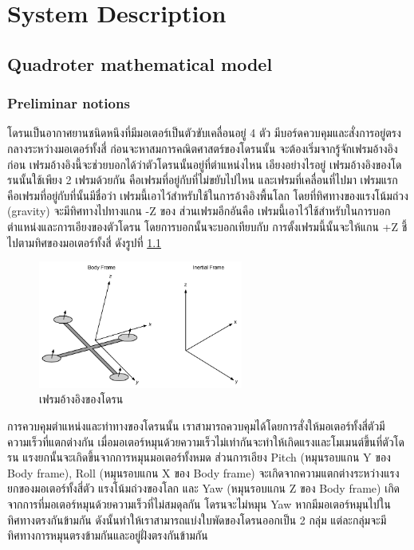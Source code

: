 \documentclass{classes/fiboReport}
\begin{document}
\chapter{System Description}
\section{Quadroter mathematical model}
\subsection{Preliminar notions}
โดรนเป็นอากาศยานชนิดหนึงที่มีมอเตอร์เป็นตัวขับเคลื่อนอยู่ 4 ตัว มีบอร์ดควบคุมและสั่งการอยู่ตรงกลางระหว่างมอเตอร์ทั้งสี่
ก่อนจะหาสมการคณิตศาสตร์ของโดรนนั้น จะต้องเริ่มจากรู้จักเฟรมอ้างอิงก่อน เฟรมอ้างอิงนี้จะช่วยบอกได้ว่าตัวโดรนนั้นอยู่ที่ตำแหน่งไหน
เอียงอย่างไรอยู่ เฟรมอ้างอิงของโดรนนั้นใช้เพียง 2 เฟรมด้วยกัน คือเฟรมที่อยู่กับที่ไม่ขยับไปไหน และเฟรมที่เคลื่อนที่ไปมา
เฟรมแรกคือเฟรมที่อยู่กับที่นั้นมีชื่อว่า  เฟรมนี้เอาไว้สำหรับใช้ในการอ้างอิงพื้นโลก
โดยที่ทิศทางของแรงโน้มถ่วง (gravity) จะมีทิศทางไปทางแกน -Z ของ 
ส่วนเฟรมอีกอันคือ  เฟรมนี้เอาไว้ใช้สำหรับในการบอกตำแหน่งและการเอียงของตัวโดรน
โดยการบอกนั้นจะบอกเทียบกับ  การตั้งเฟรมนี้นั้นจะให้แกน +Z ชี้ไปตามทิศของมอเตอร์ทั้งสี่ ดังรูปที่ \ref{fig:quadroter_coordinates}

\begin{figure}[ht]
	\centering
	\includegraphics[width=0.6\textwidth]{images/Quadcopter_Coordinates.png}
	\caption{เฟรมอ้างอิงของโดรน}
	\label{fig:quadroter_coordinates}
\end{figure}

การควบคุมตำแหน่งและท่าทางของโดรนนั้น เราสามารถควบคุมได้โดยการสั่งให้มอเตอร์ทั้งสี่ตัวมีความเร็วที่แตกต่างกัน
เมื่อมอเตอร์หมุนด้วยความเร็วไม่เท่ากันจะทำให้เกิดแรงและโมเมนต์ขึ้นที่ตัวโดรน แรงยกนั้นจะเกิดขึ้นจากการหมุนมอเตอร์ทั้งหมด
ส่วนการเอียง Pitch (หมุนรอบแกน Y ของ Body frame), Roll (หมุนรอบแกน X ของ Body frame)
จะเกิดจากความแตกต่างระหว่างแรงยกของมอเตอร์ทั้งสี่ตัว แรงโน้มถ่วงของโลก และ Yaw (หมุนรอบแกน Z ของ Body frame)
เกิดจากการที่มอเตอร์หมุนด้วยความเร็วที่ไม่สมดุลกัน โดรนจะไม่หมุน Yaw หากมีมอเตอร์หมุนไปในทิศทางตรงกันข้ามกัน
ดังนั้นทำให้เราสามารถแบ่งใบพัดของโดรนออกเป็น 2 กลุ่ม แต่ละกลุ่มจะมีทิศทางการหมุนตรงข้ามกันและอยู่ฝั่งตรงกันข้ามกัน
\end{document}
